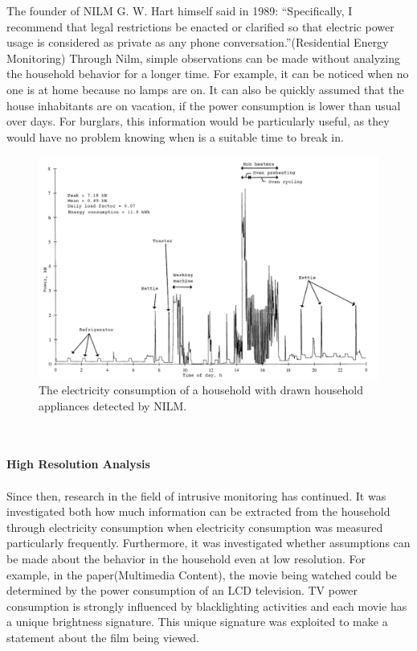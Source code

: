 The founder of NILM G. W. Hart himself said in 1989: ``Specifically, I recommend that legal restrictions be enacted or clarified so that electric power usage is considered as private as any phone conversation.''(Residential Energy Monitoring)
Through Nilm, simple observations can be made without analyzing the household behavior for a longer time. For example, it can be noticed when no one is at home because no lamps are on. It can also be quickly assumed that the house inhabitants are on vacation, if the power consumption is lower than usual over days. For burglars, this information would be particularly useful, as they would have no problem knowing when is a suitable time to break in.
\begin{figure}[tbp]
  \centering
  \includegraphics[width=1\textwidth]{images/nilm.png}
  \caption[Detected NILM Appliances]{The electricity consumption of a household with drawn household appliances detected by NILM.}
  \label{fig:Nilm}
\end{figure}
\\
\\
\textbf{High Resolution Analysis}
\\
\\
Since then, research in the field of intrusive monitoring has continued. It was investigated both how much information can be extracted from the household through electricity consumption when electricity consumption was measured particularly frequently. Furthermore, it was investigated whether assumptions can be made about the behavior in the household even at low resolution.
For example, in the paper(Multimedia Content), the movie being watched could be determined by the power consumption of an LCD television. TV power consumption is strongly influenced by blacklighting activities and each movie has a unique brightness signature. This unique signature was exploited to make a statement about the film being viewed.

